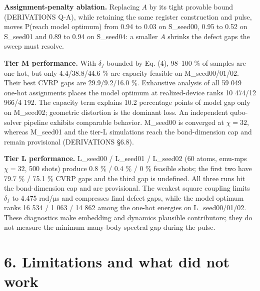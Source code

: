 \documentclass[9pt,a4paper]{extarticle}
\begin{document}
\textbf{Assignment-penalty ablation.} Replacing \(A\) by its tight
provable bound (DERIVATIONS Q-A), while retaining the same register
construction and pulse, moves P(reach model optimum) from 0.94 to 0.03
on S\_seed00, 0.95 to 0.52 on S\_seed01 and 0.89 to 0.94 on S\_seed04: a
smaller \(A\) shrinks the defect gaps the sweep must resolve.

\textbf{Tier M performance.} With \(\delta_f\) bounded by Eq. (4),
98--100 \% of samples are one-hot, but only 4.4/38.8/44.6 \% are
capacity-feasible on M\_seed00/01/02. Their best CVRP gaps are
29.9/9.2/16.0 \%. Exhaustive analysis of all 59 049 one-hot assignments
places the model optimum at realized-device ranks 10 474/12 966/4 192.
The capacity term explains 10.2 percentage points of model gap only on
M\_seed02; geometric distortion is the dominant loss. An independent
qubo-solver pipeline exhibits comparable behavior. M\_seed00 is
converged at \(\chi=32\), whereas M\_seed01 and the tier-L simulations
reach the bond-dimension cap and remain provisional (DERIVATIONS §6.8).

\textbf{Tier L performance.} L\_seed00 / L\_seed01 / L\_seed02 (60
atoms, emu-mps \(\chi=32\), 500 shots) produce 0.8 \% / 0.4 \% / 0 \%
feasible shots; the first two have 79.7 \% / 75.1 \% CVRP gaps and the
third gap is undefined. All three runs hit the bond-dimension cap and
are provisional. The weakest square coupling limits \(\delta_f\) to
4.475 rad/µs and compresses final defect gaps, while the model optimum
ranks 16 534 / 1 063 / 14 862 among the one-hot energies on
L\_seed00/01/02. These diagnostics make embedding and dynamics plausible
contributors; they do not measure the minimum many-body spectral gap
during the pulse.

\section{6. Limitations and what did not
work}\label{limitations-and-what-did-not-work}
\end{document}
